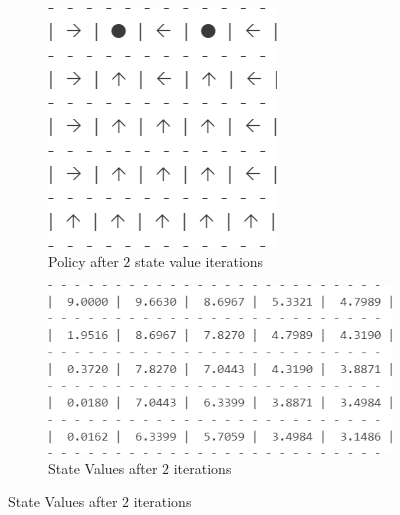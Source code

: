 \documentclass[11pt]{article}
\begin{document}
\begin{figure}
    \begin{subfigure}[t]{0.32\textwidth}
        \includegraphics[width=\textwidth]{img/3_1_b_it2_pol.png}
        \caption{Policy after $2$ state value iterations}
        \label{img:3_1_b_2t_pol}
    \end{subfigure}
    \hfill
    \begin{subfigure}[t]{0.65\textwidth}
        \includegraphics[width=\textwidth]{img/3_1_b_it2_grid.png}
        \caption{State Values after $2$ iterations}
        \label{img:3_1_b_2t_grd}
    \end{subfigure}


\end{figure}
\end{document}
